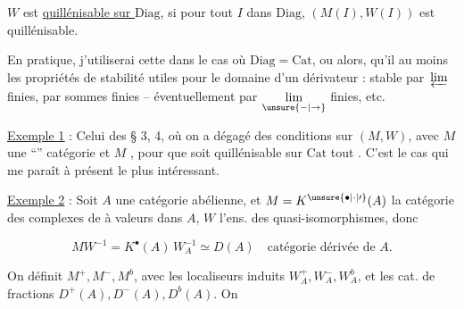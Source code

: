 
$W$ est \uline{quillénisable sur $\mathrm{Diag}$}, si pour tout $I$ dans $\mathrm{Diag}$,  $(M(I),W(I))$ est quillénisable.



En pratique, j'utiliserai cette  dans le cas où $\mathrm{Diag}=\mathrm{Cat}$, ou alors, qu'il  au moins les propriétés de stabilité utiles pour le domaine d'un dérivateur : stable par \,$\varprojlim$ finies, par sommes finies -- éventuellement par $\underset{\unsure{-|\to}}{\lim}$ finies, etc.

\uline{Exemple \uline{1}} : Celui des § 3, 4, où on a dégagé des conditions sur $(M,W)$, avec $M$ une ``'' catégorie et $M$ , pour que  soit quillénisable sur $\mathrm{Cat}$ tout . C'est le cas qui me paraît à présent le plus intéressant.

\uline{Exemple 2} : Soit $A$ une catégorie abélienne, et $M=K^{\unsure{\bullet|\cdot|\prime}}(A)$ la catégorie des complexes de  à valeurs dans $A$, $W$ l'ens. des quasi-isomorphismes, donc

\[ MW^{-1}=K^\bullet(A)\,W_A^{-1}\simeq D(A)\quad\text{catégorie dérivée de }A. \]

On définit  $M^+,M^-,M^b$, avec les localiseurs induits $W_A^+,W_A^-,W_A^b$, et les cat. de fractions $D^+(A),D^-(A),D^b(A)$. On
